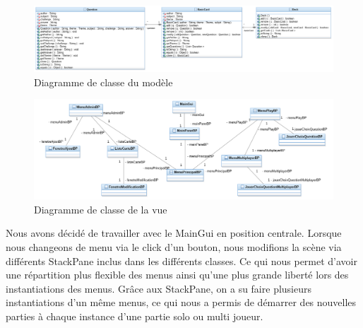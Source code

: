 \begin{figure}[h]
	\centering
	\includegraphics[width=\textwidth]{ttmc_modele.png}
	\caption{Diagramme de classe du modèle}
	\label{fig:diag_modele}
\end{figure}

\begin{figure}[h]
	\centering
	\includegraphics[width=\textwidth]{ttmc_vue.png}
	\caption{Diagramme de classe de la vue}
	\label{fig:diag_vue}
\end{figure}

Nous avons décidé de travailler avec le MainGui en position centrale.
Lorsque nous changeons de menu via le click d’un bouton, nous modifions la scène via différents StackPane inclus dans les différents classes.
Ce qui nous permet d’avoir une répartition plus flexible des menus ainsi qu'une plus grande liberté lors des instantiations des menus.
Grâce aux StackPane, on a su faire plusieurs instantiations d'un même menus, ce qui nous a permis de démarrer des nouvelles parties à chaque instance d'une partie solo ou multi joueur.

